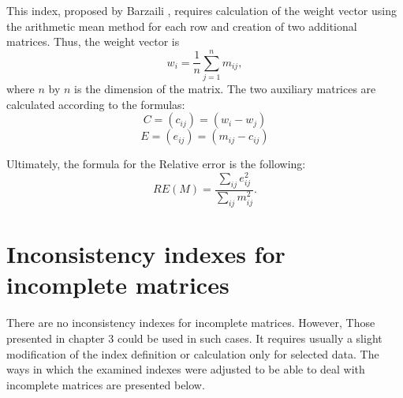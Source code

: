 This index, proposed by Barzaili \cite{Jonathan1998}, requires calculation of the weight vector using the arithmetic mean method for each row and creation of two additional matrices. Thus, the weight vector is $$w_{i}=\frac{1}{n}\sum_{j=1}^{n}m_{ij},$$ where $n$  by $n$ is the dimension of the matrix. The two auxiliary matrices are calculated according to the formulas:
$$C=\left(c_{ij}\right)=\left(w_{i}-w_{j}\right)$$
$$E=\left(e_{ij}\right)=\left(m_{ij}-c_{ij}\right)$$

Ultimately, the formula for the Relative error is the following:
	\begin{equation} 
		RE(M)=\frac{\sum_{ij}e_{ij}^{2}}{\sum_{ij}m_{ij}^{2}}.
	 \end{equation}


\section{Inconsistency indexes for incomplete matrices}
\label{sec:inconsistencyIndexesForIncompleteMatrices}

There are no inconsistency indexes for incomplete matrices. However, Those presented in chapter 3 could be used in such cases. It requires usually a slight modification of the index definition or calculation only for selected data. The ways in which the examined indexes were adjusted to be able to deal with incomplete matrices are presented below.


